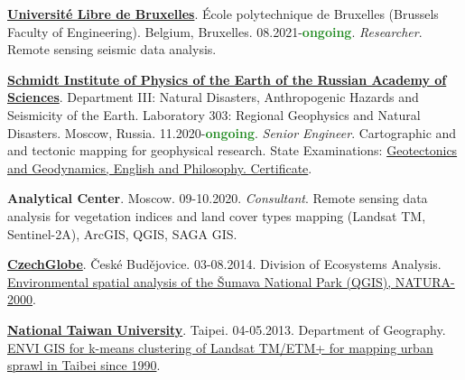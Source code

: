 \documentclass[10pt]{article}
\begin{document}

\href{https://polytech.ulb.be/}{\textbf{Université Libre de Bruxelles}}. École polytechnique de Bruxelles (Brussels Faculty of Engineering). Belgium, Bruxelles. 08.2021-\textcolor{ForestGreen}{\textbf{ongoing}}. \textit{Researcher}. Remote sensing seismic data analysis.

\vspace{5pt}

\href{https://ifz.ru/}{\textbf{Schmidt Institute of Physics of the Earth of the Russian Academy of Sciences}}. Department III: Natural Disasters, Anthropogenic Hazards and Seismicity of the Earth. Laboratory 303: Regional Geophysics and Natural Disasters. Moscow, Russia. 11.2020-\textcolor{ForestGreen}{\textbf{ongoing}}. \textit{Senior Engineer}. Cartographic and and tectonic mapping for geophysical research. State Examinations:  \href{https://drive.google.com/file/d/1D2cxxBIf5pgjPkhkfMwrXsaXrkb3GRPx/view?usp=sharing}{Geotectonics and Geodynamics, English and Philosophy. Certificate}. %
\vspace{5pt}

\textbf{Analytical Center}. Moscow. 09-10.2020. \textit{Consultant}. Remote sensing data analysis for vegetation indices and land cover types mapping (Landsat TM, Sentinel-2A), ArcGIS, QGIS, SAGA GIS.
\vspace{5pt}

\textbf{\href{http://www.czechglobe.cz/en/}{CzechGlobe}}. \v{C}esk\'{e} Bud\v{e}jovice. 03-08.2014. Division of Ecosystems Analysis. \href{https://www.researchgate.net/project/2013-2015-Czech-Republic-Sumava-National-Park-Environmental-Analysis}{Environmental spatial analysis of the \v{S}umava National Park (QGIS), NATURA-2000}.
\vspace{5pt}

\href{https://www.ntu.edu.tw/english/}{\textbf{National Taiwan University}}. Taipei. 04-05.2013. Department of Geography. \href{https://www.researchgate.net/project/2013-Taiwan-Taipei-Landsat-TM-scenes-and-ENVI-GIS-for-mapping-urban-growth}{ENVI GIS for k-means clustering of Landsat TM/ETM+ for mapping urban sprawl in Taibei since 1990}.
\vspace{5pt}
\end{document}
